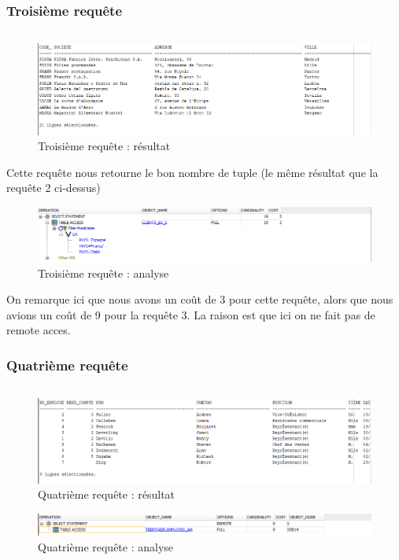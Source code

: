 \documentclass[10pt,a4paper]{article}
\theoremstyle{plain}
\begin{document}
\subsubsection{Troisième requête}
\inputminted{sql}{EUS_IV-A-3.sql}
\begin{figure}[!h]
    \centering
    \includegraphics[width=15cm]{EUS_req3.PNG}
    \caption{Troisième requête : résultat}
\end{figure}
Cette requête nous retourne le bon nombre de tuple (le même résultat que la requête 2 ci-dessus)

\begin{figure}[!h]
    \centering
    \includegraphics[width=15cm]{EUS_req3_analyse.PNG}
    \caption{Troisième requête : analyse}
\end{figure}
On remarque ici que nous avons un coût de 3 pour cette requête, alors que nous avions un coût de 9 pour la requête 3. La raison est que ici on ne fait pas de remote acces.
\newpage

\subsubsection{Quatrième requête}
\inputminted{sql}{EUS_IV-A-4.sql}
\begin{figure}[!h]
    \centering
    \includegraphics[width=15cm]{EUS_req4.PNG}
    \caption{Quatrième requête : résultat}
\end{figure}

\begin{figure}[!h]
    \centering
    \includegraphics[width=15cm]{EUS_req4_analyse.PNG}
    \caption{Quatrième requête : analyse}
\end{figure}
\newpage
\end{document}
